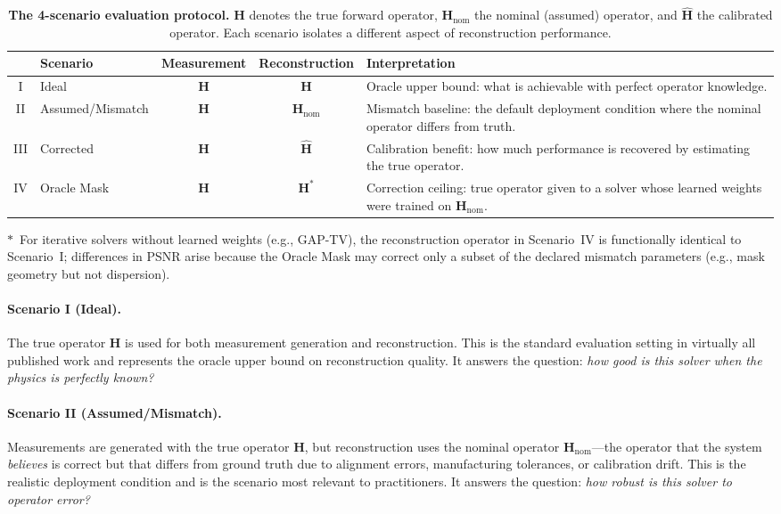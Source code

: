 \begin{table}[t]
\centering
\caption{%
  \textbf{The 4-scenario evaluation protocol.}
  $\mathbf{H}$ denotes the true forward operator,
  $\mathbf{H}_{\mathrm{nom}}$ the nominal (assumed) operator,
  and $\hat{\mathbf{H}}$ the calibrated operator.
  Each scenario isolates a different aspect of reconstruction
  performance.%
}
\label{tab:scenarios}
\smallskip
\renewcommand{\arraystretch}{1.15}
\begin{tabular}{@{}clccp{5.2cm}@{}}
\toprule
  & \textbf{Scenario}
  & \textbf{Measurement}
  & \textbf{Reconstruction}
  & \textbf{Interpretation} \\
\midrule
I   & Ideal      & $\mathbf{H}$    & $\mathbf{H}$
    & Oracle upper bound: what is achievable with perfect operator
      knowledge. \\
II  & Assumed/Mismatch    & $\mathbf{H}$    & $\mathbf{H}_{\mathrm{nom}}$
    & Mismatch baseline: the default deployment condition where the
      nominal operator differs from truth. \\
III & Corrected  & $\mathbf{H}$    & $\hat{\mathbf{H}}$
    & Calibration benefit: how much performance is recovered by
      estimating the true operator. \\
IV  & Oracle Mask & $\mathbf{H}$ & $\mathbf{H}^\ast$
    & Correction ceiling: true operator given to a solver whose
      learned weights were trained on $\mathbf{H}_{\mathrm{nom}}$. \\
\bottomrule
\end{tabular}
\end{table}

{\footnotesize $\ast$~For iterative solvers without learned weights (e.g., GAP-TV), the reconstruction operator in Scenario~IV is functionally identical to Scenario~I; differences in PSNR arise because the Oracle Mask may correct only a subset of the declared mismatch parameters (e.g., mask geometry but not dispersion).}

\paragraph{Scenario I (Ideal).}
The true operator $\mathbf{H}$ is used for both measurement generation
and reconstruction.
This is the standard evaluation setting in virtually all published
work and represents the oracle upper bound on reconstruction quality.
It answers the question: \emph{how good is this solver when the physics
is perfectly known?}

\paragraph{Scenario II (Assumed/Mismatch).}
Measurements are generated with the true operator $\mathbf{H}$, but
reconstruction uses the nominal operator
$\mathbf{H}_{\mathrm{nom}}$---the operator that the system
\emph{believes} is correct but that differs from ground truth due to
alignment errors, manufacturing tolerances, or calibration drift.
This is the realistic deployment condition and is the scenario most
relevant to practitioners.
It answers the question: \emph{how robust is this solver to operator
error?}

